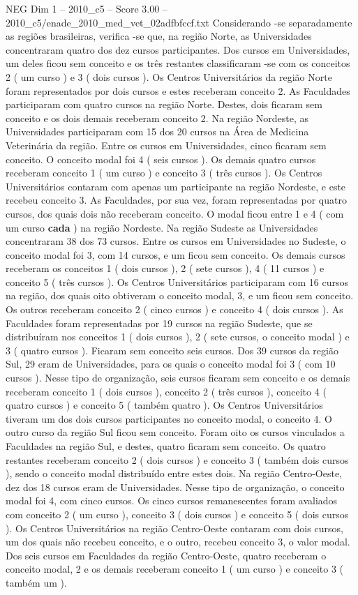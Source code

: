 \begin{textsample}{NEG Dim 1 – 2010\_c5 – Score 3.00 – 2010\_c5/enade\_2010\_med\_vet\_02adfbfccf.txt}
Considerando -se separadamente as regiões brasileiras, verifica -se que, na região Norte, as Universidades concentraram quatro dos dez cursos participantes.
Dos cursos em Universidades, um deles ficou sem conceito e os três restantes classificaram -se com os conceitos 2 ( um curso ) e 3 ( dois cursos ).
Os Centros Universitários da região Norte foram representados por dois cursos e estes receberam conceito 2.
As Faculdades participaram com quatro cursos na região Norte.
Destes, dois ficaram sem conceito e os dois demais receberam conceito 2.
Na região Nordeste, as Universidades participaram com 15 dos 20 cursos na Área de Medicina Veterinária da região.
Entre os cursos em Universidades, cinco ficaram sem conceito.
O conceito modal foi 4 ( seis cursos ).
Os demais quatro cursos receberam conceito 1 ( um curso ) e conceito 3 ( três cursos ).
Os Centros Universitários contaram com apenas um participante na região Nordeste, e este recebeu conceito 3.
As Faculdades, por sua vez, foram representadas por quatro cursos, dos quais dois não receberam conceito.
O modal ficou entre 1 e 4 ( com um curso \textbf{cada} ) na região Nordeste.
Na região Sudeste as Universidades concentraram 38 dos 73 cursos.
Entre os cursos em Universidades no Sudeste, o conceito modal foi 3, com 14 cursos, e um ficou sem conceito.
Os demais cursos receberam os conceitos 1 ( dois cursos ), 2 ( sete cursos ), 4 ( 11 cursos ) e conceito 5 ( três cursos ).
Os Centros Universitários participaram com 16 cursos na região, dos quais oito obtiveram o conceito modal, 3, e um ficou sem conceito.
Os outros receberam conceito 2 ( cinco cursos ) e conceito 4 ( dois cursos ).
As Faculdades foram representadas por 19 cursos na região Sudeste, que se distribuíram nos conceitos 1 ( dois cursos ), 2 ( sete cursos, o conceito modal ) e 3 ( quatro cursos ).
Ficaram sem conceito seis cursos.
Dos 39 cursos da região Sul, 29 eram de Universidades, para os quais o conceito modal foi 3 ( com 10 cursos ).
Nesse tipo de organização, seis cursos ficaram sem conceito e os demais receberam conceito 1 ( dois cursos ), conceito 2 ( três cursos ), conceito 4 ( quatro cursos ) e conceito 5 ( também quatro ).
Os Centros Universitários tiveram um dos dois cursos participantes no conceito modal, o conceito 4.
O outro curso da região Sul ficou sem conceito.
Foram oito os cursos vinculados a Faculdades na região Sul, e destes, quatro ficaram sem conceito.
Os quatro restantes receberam conceito 2 ( dois cursos ) e conceito 3 ( também dois cursos ), sendo o conceito modal distribuído entre estes dois.
Na região Centro-Oeste, dez dos 18 cursos eram de Universidades.
Nesse tipo de organização, o conceito modal foi 4, com cinco cursos.
Os cinco cursos remanescentes foram avaliados com conceito 2 ( um curso ), conceito 3 ( dois cursos ) e conceito 5 ( dois cursos ).
Os Centros Universitários na região Centro-Oeste contaram com dois cursos, um dos quais não recebeu conceito, e o outro, recebeu conceito 3, o valor modal.
Dos seis cursos em Faculdades da região Centro-Oeste, quatro receberam o conceito modal, 2 e os demais receberam conceito 1 ( um curso ) e conceito 3 ( também um ).

\end{textsample}
